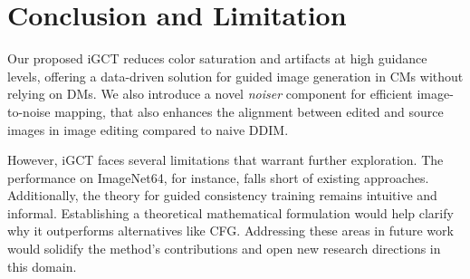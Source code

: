 \vspace{-0.3cm}
\section{Conclusion and Limitation}
\vspace{-0.1cm}

Our proposed iGCT reduces color saturation and artifacts at high guidance levels, offering a data-driven solution for guided image generation in CMs without relying on DMs. We also introduce a novel \textit{noiser} component for efficient image-to-noise mapping, that also enhances the alignment between edited and source images in image editing compared to naive DDIM.

However, iGCT faces several limitations that warrant further exploration. The performance on ImageNet64, for instance, falls short of existing approaches. Additionally, the theory for guided consistency training remains intuitive and informal. Establishing a theoretical mathematical formulation would help clarify why it outperforms alternatives like CFG. Addressing these areas in future work would solidify the method's contributions and open new research directions in this domain. 

\label{sec:conclusion}
